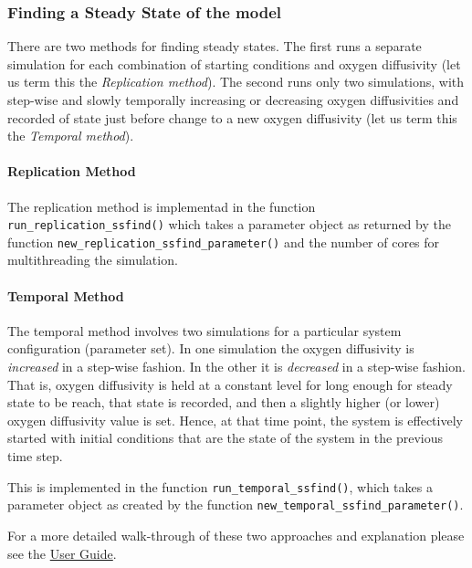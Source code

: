 \documentclass[]{elsarticle} %
\begin{document}
\hypertarget{finding-a-steady-state-of-the-model}{%
\subsubsection{Finding a Steady State of the
model}\label{finding-a-steady-state-of-the-model}}

There are two methods for finding steady states. The first runs a
separate simulation for each combination of starting conditions and
oxygen diffusivity (let us term this the \emph{Replication method}). The
second runs only two simulations, with step-wise and slowly temporally
increasing or decreasing oxygen diffusivities and recorded of state just
before change to a new oxygen diffusivity (let us term this the
\emph{Temporal method}).

\hypertarget{replication-method}{%
\paragraph{Replication Method}\label{replication-method}}

The replication method is implementad in the function
\texttt{run\_replication\_ssfind()} which takes a parameter object as
returned by the function \texttt{new\_replication\_ssfind\_parameter()}
and the number of cores for multithreading the simulation.

\hypertarget{temporal-method}{%
\paragraph{Temporal Method}\label{temporal-method}}

The temporal method involves two simulations for a particular system
configuration (parameter set). In one simulation the oxygen diffusivity
is \emph{increased} in a step-wise fashion. In the other it is
\emph{decreased} in a step-wise fashion. That is, oxygen diffusivity is
held at a constant level for long enough for steady state to be reach,
that state is recorded, and then a slightly higher (or lower) oxygen
diffusivity value is set. Hence, at that time point, the system is
effectively started with initial conditions that are the state of the
system in the previous time step.

This is implemented in the function \texttt{run\_temporal\_ssfind()},
which takes a parameter object as created by the function
\texttt{new\_temporal\_ssfind\_parameter()}.

For a more detailed walk-through of these two approaches and explanation
please see the \href{@LINK_NEEDED}{User Guide}.
\end{document}
